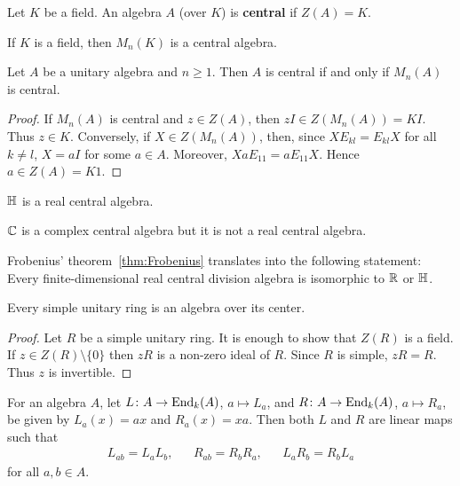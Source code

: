 \begin{definition}
    Let $K$ be a field. 
	An algebra $A$ (over $K$) is \textbf{central} if $Z(A)=K$. 
\end{definition}

If $K$ is a field, then $M_n(K)$ is a central algebra.

\begin{proposition}
	Let $A$ be a unitary algebra and $n\geq1$. Then
	$A$ is central if and only if $M_n(A)$ is central.
\end{proposition}

\begin{proof}
	If $M_n(A)$ is central and $z\in Z(A)$, then
	$zI\in Z(M_n(A))=KI$. Thus
	$z\in K$. Conversely, if $X\in Z(M_n(A))$, then, since 
	$XE_{kl}=E_{kl}X$ for all $k\ne l$, $X=aI$ for some $a\in A$. 
	Moreover, 
	$XaE_{11}=aE_{11}X$. Hence $a\in Z(A)=K1$. 
\end{proof}

\begin{example}
	$\mathbb{H}$ is a real central algebra.
\end{example}

\begin{example}
	$\mathbb{C}$ is a complex central algebra but it is not a real central 
	algebra. 
\end{example}

Frobenius' theorem~\ref{thm:Frobenius} translates into 
the following statement: Every finite-dimensional  
real central division algebra is isomorphic to $\mathbb{R}$ or $\mathbb{H}$. 

\begin{proposition}
	Every simple unitary ring is an algebra over its center. 
\end{proposition}

\begin{proof}
	Let $R$ be a simple unitary ring. It is enough to show that
	$Z(R)$ is a field. If $z\in
	Z(R)\setminus\{0\}$ then $zR$ is a non-zero ideal of $R$. Since $R$
	is simple, $zR=R$. Thus $z$ is invertible. 
\end{proof}

For an algebra $A$, let $L\colon A\to\operatorname{End}_k(A)$,
$a\mapsto L_a$, and $R\colon A\to\operatorname{End}_k(A)$, $a\mapsto R_a$, be given by 
$L_a(x)=ax$ and $R_a(x)=xa$. Then both $L$ and $R$ are linear maps such that 
\begin{align*}
	L_{ab}=L_aL_b, && R_{ab}=R_bR_a, &&	L_aR_b=R_bL_a
\end{align*}
for all $a,b\in A$.

